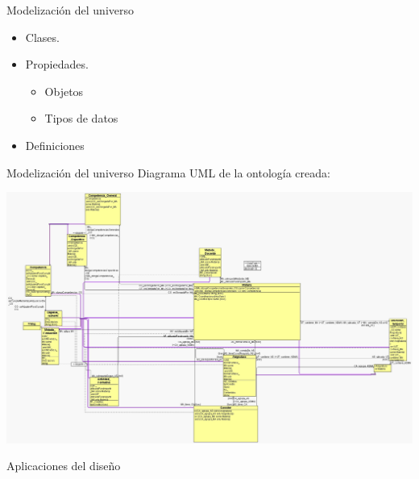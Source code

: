 \documentclass[notes=show,19 pt]{beamer}
\begin{document}
\begin{frame}{Modelización del universo}
\begin{LARGE}

	\begin{itemize}
		\item Clases.
		\item Propiedades.
		\begin{itemize}
			\item Objetos
			\item Tipos de datos
		\end{itemize}
		\item Definiciones
	\end{itemize}		
	
\end{LARGE}
\end{frame}

\begin{frame}{Modelización del universo}
	Diagrama UML de la ontología creada:
	\begin{center}
		\includegraphics[width=1\textwidth]{Herramientas-OWLGrEd.png}
	\end{center}
\end{frame}

\lstset{inputencoding=latin1}
\lstset{language=protege,basicstyle=\sffamily,columns=flexible,mathescape}
\begin{frame}[fragile]{Aplicaciones del diseño}
 	
	
\end{frame}
\end{document}
